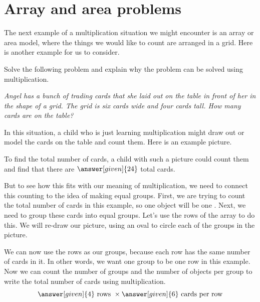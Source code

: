 \documentclass{ximera}
\begin{document}
\section{Array and area problems}

The next example of a multiplication situation we might encounter is an array or area model, where the things we would like to count are arranged in a grid. Here is another example for us to consider.

\begin{example}
Solve the following problem and explain why the problem can be solved using multiplication.

\emph{Angel has a bunch of trading cards that she laid out on the table in front of her in the shape of a grid. The grid is six cards wide and four cards tall. How many cards are on the table?}

In this situation, a child who is just learning multiplication might draw out or model the cards on the table and count them. Here is an example picture.
\begin{image}
\end{image}

To find the total number of cards, a child with such a picture could count them and find that there are $\answer[given]{24}$ total cards. 

But to see how this fits with our meaning of multiplication, we need to connect this counting to the idea of making equal groups. First, we are trying to count the total number of cards in this example, so one object will be one . Next, we need to group these cards into equal groups. Let's use the rows of the array to do this. We will re-draw our picture, using an oval to circle each of the groups in the picture. 

\begin{image}
\end{image}

We can now use the rows as our groups, because each row has the same number of cards in it. In other words, we want one group to be one row in this example. Now we can count the number of groups and the number of objects per group to write the total number of cards using multiplication. 
\[
\answer[given]{4} \textrm{ rows } \times \answer[given]{6} \textrm{ cards per row}
\]


\end{example}
\end{document}
